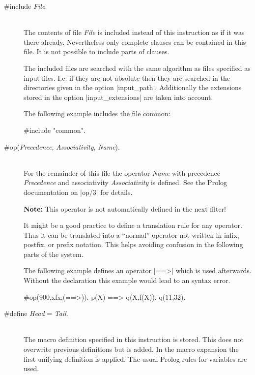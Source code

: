 \begin{description}
\item [\#include {\em File}.]\ \\
  The contents of file {\em File} is included instead of this instruction as
  if it was there already. Nevertheless only complete clauses can be contained
  in this file. It is not possible to include parts of clauses.

  The included files are searched with the same algorithm as files specified
  as input files. I.e. if they are not absolute then they are searched in the
  directories given in the option
  |input_path|. Additionally the extensions stored in the
  option |input_extensions| are taken into account.

  The following example includes the file {\sf common}:

\begin{BoxedSample}
  \#include "common".
\end{BoxedSample}

\item [\#op({\em Precedence}, {\em Associativity}, {\em Name}\/).]\ \\
  For the remainder of this file the operator {\em Name} with precedence {\em
    Precedence} and associativity {\em Associativity} is defined. See the
  Prolog documentation on |op/3| for details.

  {\bf Note:} This operator is not automatically defined in the next filter!

  It might be a good practice to define a translation rule for any
  operator. Thus it can be translated into a ``normal'' operator not written
  in infix, postfix, or prefix notation. This helps avoiding confusion in the
  following parts of the system.

  The following example defines an operator |==>| which is used
  afterwards. Without the declaration this example would lead to an syntax
  error.

\begin{BoxedSample}
  \#op(900,xfx,(==>)).
  p(X) ==> q(X,f(X)).
  q(11,32).
\end{BoxedSample}

\item [\#define {\em Head} = {\em Tail}.]\ \\
  The macro definition specified in this instruction is stored. This does not
  overwrite previous definitions but is added. In the macro expansion the
  first unifying definition is applied.  The usual Prolog rules for variables
  are used.


\end{description}
